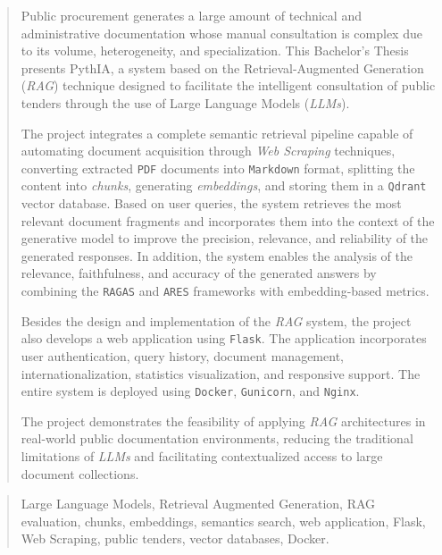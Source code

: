 \documentclass[a4paper,12pt,twoside]{memoir}
\newcommand{\file}[1]{\texttt{#1}}
\newcommand{\eng}[1]{\textit{#1}}
\begin{document}
\clearpage

\renewcommand*\abstractname{Abstract}
\begin{abstract}
Public procurement generates a large amount of technical and administrative documentation whose manual consultation is complex due to its volume, heterogeneity, and specialization. This Bachelor’s Thesis presents PythIA, a system based on the Retrieval-Augmented Generation (\eng{RAG}) technique designed to facilitate the intelligent consultation of public tenders through the use of Large Language Models (\eng{LLMs}).

The project integrates a complete semantic retrieval pipeline capable of automating document acquisition through \eng{Web Scraping} techniques, converting extracted \file{PDF} documents into \file{Markdown} format, splitting the content into \eng{chunks}, generating \eng{embeddings}, and storing them in a \file{Qdrant} vector database. Based on user queries, the system retrieves the most relevant document fragments and incorporates them into the context of the generative model to improve the precision, relevance, and reliability of the generated responses. In addition, the system enables the analysis of the relevance, faithfulness, and accuracy of the generated answers by combining the \file{RAGAS} and \file{ARES} frameworks with embedding-based metrics.

Besides the design and implementation of the \eng{RAG} system, the project also develops a web application using \file{Flask}. The application incorporates user authentication, query history, document management, internationalization, statistics visualization, and responsive support. The entire system is deployed using \file{Docker}, \file{Gunicorn}, and \file{Nginx}.

The project demonstrates the feasibility of applying \eng{RAG} architectures in real-world public documentation environments, reducing the traditional limitations of \eng{LLMs} and facilitating contextualized access to large document collections.
\end{abstract}

\renewcommand*\abstractname{Keywords}
\begin{abstract}
Large Language Models, Retrieval Augmented Generation, RAG evaluation, chunks, embeddings, semantics search, web application, Flask, Web Scraping, public tenders, vector databases, Docker.
\end{abstract}

\clearpage
\end{document}
